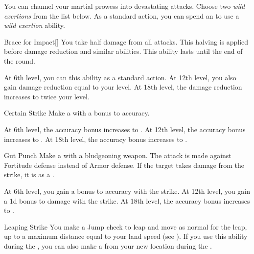         You can channel your martial prowess into devastating attacks.
        Choose two \textit{wild exertions} from the list below.
        As a standard action, you can spend an  to use a \textit{wild exertion} ability.
        {
            \begin{ability}{Brace for Impact}[]
                You take half damage from all attacks.
                This halving is applied before damage reduction and similar abilities.
                This ability lasts until the end of the round.

                At 6th level, you can  this ability as a standard action.
                At 12th level, you also gain damage reduction equal to your level.
                At 18th level, the damage reduction increases to twice your level.
            \end{ability}

            \begin{ability}{Certain Strike}
                Make a  with a  bonus to accuracy.

                At 6th level, the accuracy bonus increases to .
                At 12th level, the accuracy bonus increases to .
                At 18th level, the accuracy bonus increases to .
            \end{ability}

            \begin{ability}{Gut Punch}
                Make a  with a bludgeoning weapon.
                The attack is made against Fortitude defense instead of Armor defense.
                If the target takes damage from the strike, it is \sickened as a .

                At 6th level, you gain a  bonus to accuracy with the strike.
                At 12th level, you gain a \plus1d bonus to damage with the strike.
                At 18th level, the accuracy bonus increases to .
            \end{ability}

            \begin{ability}{Leaping Strike}
                You make a Jump check to leap and move as normal for the leap, up to a maximum distance equal to your land speed (see ).
                If you use this ability during the , you can also make a  from your new location during the .


\end{ability}}
